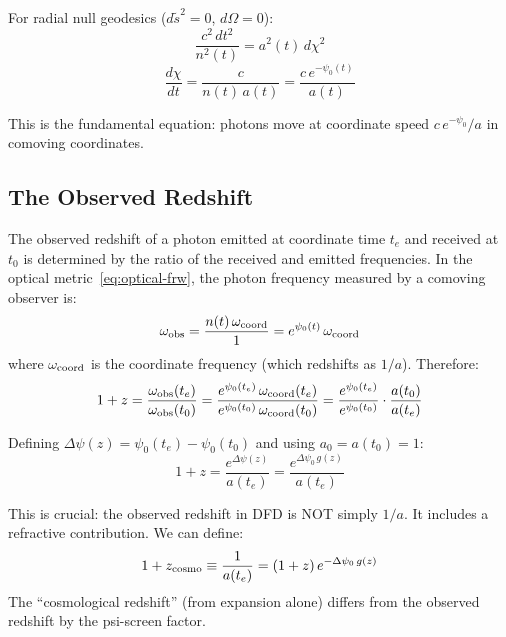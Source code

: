 \documentclass[11pt,a4paper]{article}
\begin{document}
For radial null geodesics ($d\tilde{s}^2 = 0$, $d\Omega = 0$):
\begin{equation}
\frac{c^2\,dt^2}{n^2(t)} = a^2(t)\,d\chi^2
\end{equation}
\begin{equation}
\frac{d\chi}{dt} = \frac{c}{n(t)\,a(t)} = \frac{c\,e^{-\psi_0(t)}}{a(t)}
\label{eq:null-geodesic}
\end{equation}

This is the fundamental equation: photons move at coordinate speed
$c\,e^{-\psi_0}/a$ in comoving coordinates.

\subsection{The Observed Redshift}

The observed redshift of a photon emitted at coordinate time $t_e$ and
received at $t_0$ is determined by the ratio of the received and emitted
frequencies. In the optical metric~\eqref{eq:optical-frw}, the photon
frequency measured by a comoving observer is:
\begin{equation}
\omega_{\rm obs} = \frac{n(t)\,\omega_{\rm coord}}{1} = e^{\psi_0(t)}\,\omega_{\rm coord}
\end{equation}
where $\omega_{\rm coord}$ is the coordinate frequency (which redshifts
as $1/a$). Therefore:
\begin{equation}
1 + z = \frac{\omega_{\rm obs}(t_e)}{\omega_{\rm obs}(t_0)}
= \frac{e^{\psi_0(t_e)}\,\omega_{\rm coord}(t_e)}{e^{\psi_0(t_0)}\,\omega_{\rm coord}(t_0)}
= \frac{e^{\psi_0(t_e)}}{e^{\psi_0(t_0)}} \cdot \frac{a(t_0)}{a(t_e)}
\end{equation}

Defining $\Delta\psi(z) = \psi_0(t_e) - \psi_0(t_0)$ and using $a_0 = a(t_0) = 1$:
\begin{equation}
\boxed{
1 + z = \frac{e^{\Delta\psi(z)}}{a(t_e)}
= \frac{e^{\Delta\psi_0\,g(z)}}{a(t_e)}
}
\label{eq:redshift-dfd}
\end{equation}

This is crucial: the observed redshift in DFD is NOT simply $1/a$.
It includes a refractive contribution. We can define:
\begin{equation}
1 + z_{\rm cosmo} \equiv \frac{1}{a(t_e)} = (1+z)\,e^{-\Delta\psi_0\,g(z)}
\end{equation}
The ``cosmological redshift'' (from expansion alone) differs from the
observed redshift by the psi-screen factor.
\end{document}
